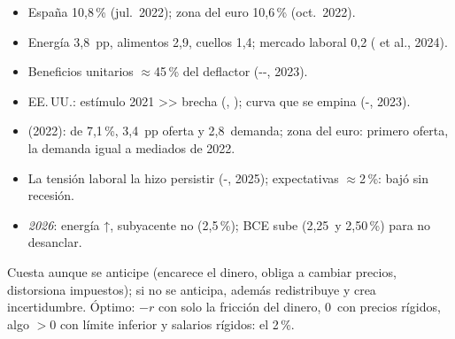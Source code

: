 \documentclass{article}
\begin{document}
\begin{columnas}
\begin{itemize}
\item España 10,8\,\% (jul.\ 2022); zona del euro 10,6\,\% (oct.\ 2022).
\end{itemize}
\begin{itemize}
\item Energía 3,8~pp, alimentos 2,9, cuellos 1,4; mercado laboral 0,2 ( et al., 2024).
\item Beneficios unitarios $\approx$45\,\% del deflactor (--, 2023).
\end{itemize}
\begin{itemize}
\item EE.\,UU.: estímulo 2021 >> brecha (, ); curva que se empina (-, 2023).
\item {} (2022): de 7,1\,\%, 3,4~pp oferta y 2,8~demanda; zona del euro: primero oferta, la demanda igual a mediados de 2022.
\end{itemize}
\begin{itemize}
\item La tensión laboral la hizo persistir (-, 2025); expectativas $\approx$2\,\%: bajó sin recesión.
\item \emph{2026}: energía ↑, subyacente no (2,5\,\%); BCE sube (2,25~y 2,50\,\%) para no desanclar.
\end{itemize}

\begin{ideaclave}
Cuesta aunque se anticipe (encarece el dinero, obliga a cambiar precios, distorsiona impuestos); si no se anticipa, además redistribuye y crea incertidumbre. Óptimo: $-r$ con solo la fricción del dinero, 0~con precios rígidos, algo $>0$ con límite inferior y salarios rígidos: el 2\,\%.
\end{ideaclave}


\end{columnas}
\end{document}
